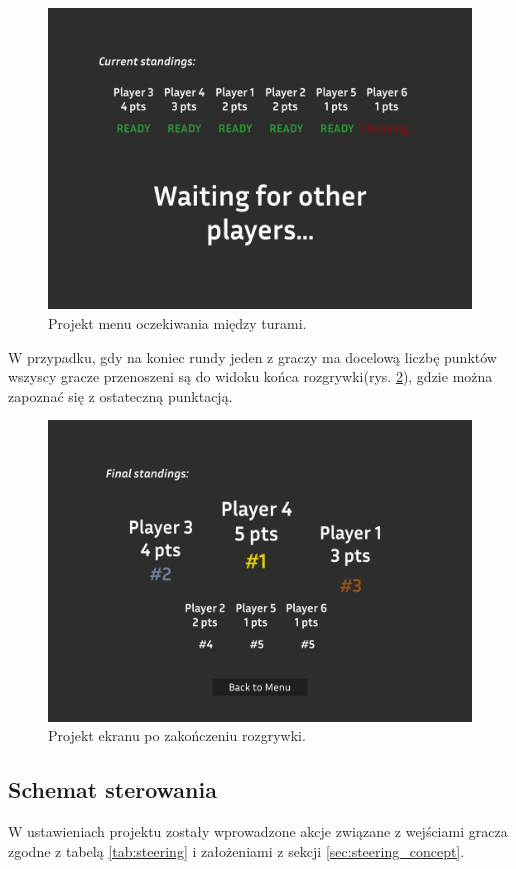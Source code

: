 \begin{figure}
    \centering
    \includegraphics[width=.8\linewidth]{Images/design/Waiting Menu.png}
    \caption{Projekt menu oczekiwania między turami.}
    \label{fig:waiting_menu}
\end{figure}

W przypadku, gdy na koniec rundy jeden z graczy ma docelową liczbę punktów wszyscy gracze przenoszeni są do widoku końca rozgrywki(rys. \ref{fig:final_menu}), gdzie można zapoznać się z ostateczną punktacją.

\begin{figure}
    \centering
    \includegraphics[width=.8\linewidth]{Images/design/Final Menu.png}
    \caption{Projekt ekranu po zakończeniu rozgrywki.}
    \label{fig:final_menu}
\end{figure}

\subsection{Schemat sterowania}

W ustawieniach projektu zostały wprowadzone akcje związane z wejściami gracza zgodne z tabelą \ref{tab:steering} i założeniami z sekcji \ref{sec:steering_concept}.

